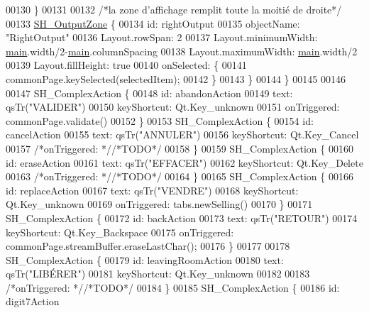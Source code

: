 \begin{DoxyCode}
00130         \}
00131 
00132         \textcolor{comment}{/*la zone d'affichage remplit toute la moitié de droite*/}
00133         \hyperlink{classSH__OutputZone}{SH\_OutputZone} \{
00134             \textcolor{keywordtype}{id}: rightOutput
00135             objectName: \textcolor{stringliteral}{"RightOutput"}
00136             Layout.rowSpan: 2
00137             Layout.minimumWidth: \hyperlink{main_8cpp_a3c04138a5bfe5d72780bb7e82a18e627}{main}.width/2-\hyperlink{main_8cpp_a3c04138a5bfe5d72780bb7e82a18e627}{main}.columnSpacing
00138             Layout.maximumWidth: \hyperlink{main_8cpp_a3c04138a5bfe5d72780bb7e82a18e627}{main}.width/2
00139             Layout.fillHeight: \textcolor{keyword}{true}
00140             onSelected: \{
00141                 commonPage.keySelected(selectedItem);
00142             \}
00143         \}
00144     \}
00145 
00146 
00147     SH\_ComplexAction \{
00148         \textcolor{keywordtype}{id}: abandonAction
00149         text: qsTr(\textcolor{stringliteral}{"VALIDER"})
00150         keyShortcut: Qt.Key\_unknown
00151         onTriggered: commonPage.validate()
00152     \}
00153     SH\_ComplexAction \{
00154         \textcolor{keywordtype}{id}: cancelAction
00155         text: qsTr(\textcolor{stringliteral}{"ANNULER"})
00156         keyShortcut: Qt.Key\_Cancel
00157         \textcolor{comment}{/*onTriggered: */}\textcolor{comment}{/*TODO*/}
00158     \}
00159     SH\_ComplexAction \{
00160         \textcolor{keywordtype}{id}: eraseAction
00161         text: qsTr(\textcolor{stringliteral}{"EFFACER"})
00162         keyShortcut: Qt.Key\_Delete
00163         \textcolor{comment}{/*onTriggered: */}\textcolor{comment}{/*TODO*/}
00164     \}
00165     SH\_ComplexAction \{
00166         \textcolor{keywordtype}{id}: replaceAction
00167         text: qsTr(\textcolor{stringliteral}{"VENDRE"})
00168         keyShortcut: Qt.Key\_unknown
00169         onTriggered: tabs.newSelling()
00170     \}
00171     SH\_ComplexAction \{
00172         \textcolor{keywordtype}{id}: backAction
00173         text: qsTr(\textcolor{stringliteral}{"RETOUR"})
00174         keyShortcut: Qt.Key\_Backspace
00175         onTriggered: commonPage.streamBuffer.eraseLastChar();
00176     \}
00177 
00178     SH\_ComplexAction \{
00179         \textcolor{keywordtype}{id}: leavingRoomAction
00180         text: qsTr(\textcolor{stringliteral}{"LIBÉRER"})
00181         keyShortcut: Qt.Key\_unknown
00182 
00183         \textcolor{comment}{/*onTriggered: */}\textcolor{comment}{/*TODO*/}
00184     \}
00185     SH\_ComplexAction \{
00186         \textcolor{keywordtype}{id}: digit7Action

\end{DoxyCode}
